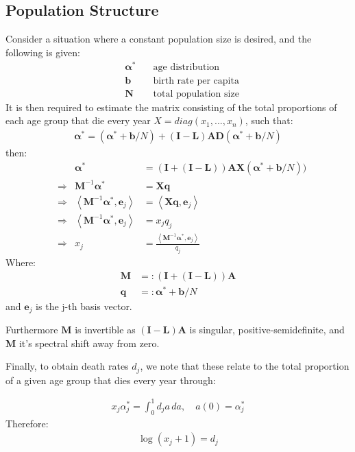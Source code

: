 \documentclass{article}
\theoremstyle{definition}
\begin{document}
\subsection{Population Structure}
Consider a situation where a constant population size is desired, and the following is given: 
\begin{align*}
&\mathbf{\alpha}^* &\quad \text{age distribution}\\
&\mathbf{b} &\quad \text{birth rate per capita}\\
&\mathbf{N} &\quad \text{total population size}
\end{align*}
It is then required to estimate the matrix consisting of the total proportions of each age group that die every year $X=diag(x_1,...,x_n)$, such that:
\begin{gather*}
\mathbf{\alpha}^* = (\mathbf{\alpha}^* +\mathbf{b}/N) + (\mathbf{I}-\mathbf{L})\mathbf{A}\mathbf{D}(\mathbf{\alpha}^*+\mathbf{b}/N)
\end{gather*}
then:
\begin{align*}
&&\mathbf{\alpha}^* &= (\mathbf{I} +(\mathbf{I}-\mathbf{L}))\mathbf{A}\mathbf{X}(\mathbf{\alpha}^*+\mathbf{b}/N))\\
&\Rightarrow&\mathbf{M}^{-1}\mathbf{\alpha}^* &= \mathbf{X}\mathbf{q}\\
&\Rightarrow&\left<\mathbf{M}^{-1}\mathbf{\alpha}^*,\mathbf{e}_j\right> &= \left<\mathbf{Xq},\mathbf{e}_j\right>\\
&\Rightarrow& \left<\mathbf{M}^{-1}\mathbf{\alpha}^*,\mathbf{e}_j\right> &= x_jq_j\\
&\Rightarrow&x_j &= \frac{\left<\mathbf{M}^{-1}\mathbf{\alpha}^*,\mathbf{e}_j\right>}{q_j}
\end{align*}
Where:
\begin{align*}
\mathbf{M}&=:(\mathbf{I} +(\mathbf{I}-\mathbf{L}))\mathbf{A}\\
\mathbf{q}&=:\mathbf{\alpha}^*+\mathbf{b}/N
\end{align*}
and $\mathbf{e}_j$ is the j-th basis vector.

Furthermore $\mathbf{M}$ is invertible as $(\mathbf{I}-\mathbf{L})\mathbf{A}$ is singular, positive-semidefinite, and $\mathbf{M}$ it's spectral shift away from zero.

Finally, to obtain death rates $d_j$, we note that these relate to the total proportion of a given age group that dies every year through:

\begin{gather*}
x_j\alpha^*_j = \int_0^1  d_j a \,da, \quad a(0) = \alpha^*_j
\end{gather*}
Therefore:
\begin{gather*}
\log(x_j+1)= d_j
\end{gather*} 
\newpage
\printbibliography  
\end{document}
